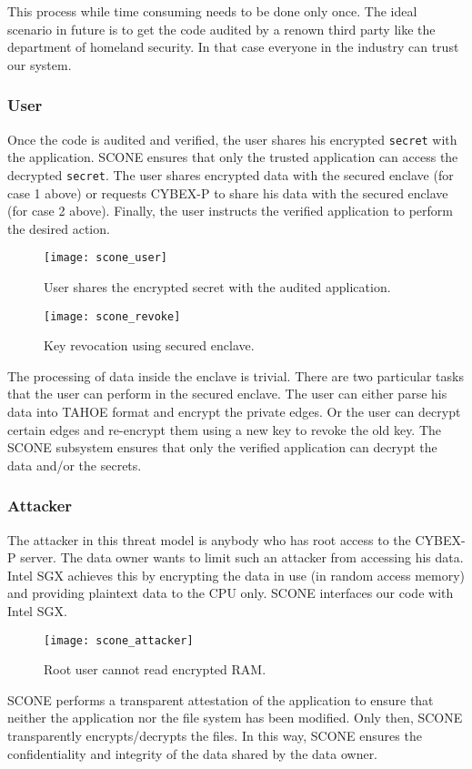 This process while time consuming needs to be done only once. The ideal scenario in future is to get the code audited by a renown third party like the department of homeland security. In that case everyone in the industry can trust our system.

\subsubsection{User}

Once the code is audited and verified, the user shares his encrypted \texttt{secret} with the application. SCONE ensures that only the trusted application can access the decrypted \texttt{secret}. The user shares encrypted data with the secured enclave (for case 1 above) or requests CYBEX-P to share his data with the secured enclave (for case 2 above). Finally, the user instructs the verified application to perform the desired action.

\begin{figure}[ht]
	\texttt{[image: scone\_user]}
	\centering
	\caption{User shares the encrypted secret with the audited application.}
	\label{fig:user}
\end{figure}

\begin{figure}[ht]
	\texttt{[image: scone\_revoke]}
	\centering
	\caption{Key revocation using secured enclave.}
	\label{fig:revoke}
\end{figure}

The processing of data inside the enclave is trivial. There are two particular tasks that the user can perform in the secured enclave. The user can either parse his data into TAHOE format and encrypt the private edges. Or the user can decrypt certain edges and re-encrypt them using a new key to revoke the old key. The SCONE subsystem ensures that only the verified application can decrypt the data and/or the secrets.

\subsubsection{Attacker}

The attacker in this threat model is anybody who has root access to the CYBEX-P server. The data owner wants to limit such an attacker from accessing his data. Intel SGX achieves this by encrypting the data in use (in random access memory) and providing plaintext data to the CPU only. SCONE interfaces our code with Intel SGX.

\begin{figure}[ht]
	\texttt{[image: scone\_attacker]}
	\centering
	\caption{Root user cannot read encrypted RAM.}
	\label{fig:attacker}
\end{figure}

SCONE performs a transparent attestation of the application to ensure that neither the application nor the file system has been modified. Only then, SCONE transparently encrypts/decrypts the files. In this way, SCONE ensures the confidentiality and integrity of the data shared by the data owner.

\fi